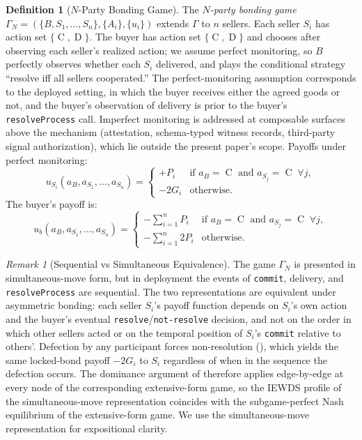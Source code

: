 \documentclass[11pt,a4paper]{article}
\theoremstyle{definition}
\newtheorem{definition}[theorem]{Definition}
\theoremstyle{remark}
\newtheorem{remark}[theorem]{Remark}
\newcommand{\pay}{P}           %
\newcommand{\cumval}{G}        %
\newcommand{\ub}{u_b}          %
\DeclareMathOperator{\Coop}{C}
\DeclareMathOperator{\Def}{D}
\begin{document}
\begin{definition}[$N$-Party Bonding Game]
\label{def:n-party-game}
The \emph{$N$-party bonding game}
$\Gamma_N = (\{B, S_1, \ldots, S_n\}, \{A_i\}, \{u_i\})$
extends $\Gamma$ to $n$ sellers. Each seller $S_i$ has action set
$\{\Coop, \Def\}$. The buyer has action set $\{\Coop, \Def\}$ and
chooses after observing each seller's realized action; we assume
perfect monitoring, so $B$ perfectly observes whether each $S_i$
delivered, and plays the conditional strategy ``resolve iff all
sellers cooperated.'' The perfect-monitoring assumption
corresponds to the deployed setting, in which the buyer receives
either the agreed goods or not, and the buyer's observation of
delivery is prior to the buyer's \texttt{resolveProcess} call.
Imperfect monitoring is addressed at composable surfaces above
the mechanism (attestation, schema-typed witness records,
third-party signal authorization), which lie outside the present
paper's scope. Payoffs under perfect monitoring:
\begin{equation}\label{eq:n-party-seller-utility}
  u_{S_i}(a_B, a_{S_1}, \ldots, a_{S_n}) =
  \begin{cases}
    +\pay_i & \text{if } a_B = \Coop \text{ and } a_{S_j} = \Coop
      \;\forall j, \\
    -2\cumval_i & \text{otherwise}.
  \end{cases}
\end{equation}
The buyer's payoff is:
\begin{equation}\label{eq:n-party-buyer-utility}
  \ub(a_B, a_{S_1}, \ldots, a_{S_n}) =
  \begin{cases}
    -\sum_{i=1}^{n} \pay_i & \text{if } a_B = \Coop \text{ and }
      a_{S_j} = \Coop \;\forall j, \\
    -\sum_{i=1}^{n} 2\pay_i & \text{otherwise}.
  \end{cases}
\end{equation}
\end{definition}

\begin{remark}[Sequential vs Simultaneous Equivalence]
\label{rem:sequential-simultaneous}
The game $\Gamma_N$ is presented in simultaneous-move form, but in
deployment the events of \texttt{commit}, delivery, and
\texttt{resolveProcess} are sequential. The two representations are
equivalent under asymmetric bonding: each seller $S_i$'s payoff
function depends on $S_i$'s own action and the buyer's eventual
\texttt{resolve}/\texttt{not-resolve} decision, and not on the
order in which other sellers acted or on the temporal position of
$S_i$'s \texttt{commit} relative to others'. Defection by any
participant forces non-resolution
(), which yields the same locked-bond
payoff $-2\cumval_i$ to $S_i$ regardless of when in the sequence
the defection occurs. The dominance argument of
 therefore applies edge-by-edge at every
node of the corresponding extensive-form game, so the IEWDS
profile of the simultaneous-move representation coincides with
the subgame-perfect Nash equilibrium of the extensive-form game.
We use the simultaneous-move representation for expositional
clarity.
\end{remark}
\end{document}
